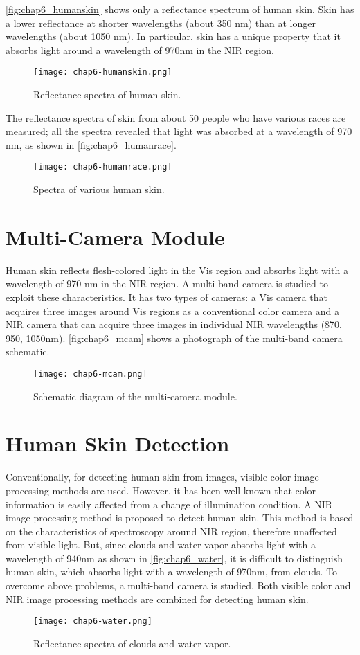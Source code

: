 \autoref{fig:chap6_humanskin} shows only a reflectance spectrum of human
skin. Skin has a lower reflectance at shorter wavelengths (about 350 nm) than at
longer wavelengths (about 1050 nm). In particular, skin has a unique
property that it absorbs light around a wavelength of 970nm in the NIR region.
\begin{figure}[ht]
  \centering
    \texttt{[image: chap6-humanskin.png]}
  \caption{Reflectance spectra of human skin.}
  \label{fig:chap6_humanskin}
\end{figure}

The reflectance spectra of skin from about 50 people who have various
races are measured; all the spectra revealed that light was absorbed
at a wavelength of 970 nm, as shown in \autoref{fig:chap6_humanrace}.

\begin{figure}[ht]
  \centering
    \texttt{[image: chap6-humanrace.png]}
  \caption{Spectra of various human skin.}
  \label{fig:chap6_humanrace}
\end{figure}

\section{Multi-Camera Module}
Human skin reflects flesh-colored light in the Vis region and absorbs light
with a wavelength of 970 nm in the NIR region. A multi-band camera is studied to
exploit these characteristics. It has two types of cameras: a Vis camera that
acquires three images around Vis regions as a conventional color camera and
a NIR camera that can acquire three images in individual NIR wavelengths (870, 950,
1050nm). \autoref{fig:chap6_mcam} shows a photograph of the multi-band camera schematic.

\begin{figure}[hb]
  \centering
    \texttt{[image: chap6-mcam.png]}
  \caption{Schematic diagram of the multi-camera module.}
  \label{fig:chap6_mcam}
\end{figure}
\section {Human Skin Detection}
Conventionally, for detecting human skin from images,
visible color image processing methods are used.
However, it has been well known that color information is easily affected
from a change of illumination condition. A NIR image processing method is proposed
to detect human skin. This method is based on the characteristics of spectroscopy
around NIR region, therefore unaffected from visible
light. But, since clouds and water vapor absorbs light
with a wavelength of 940nm as shown in \autoref{fig:chap6_water},
it is difficult to distinguish human skin, which absorbs light with a wavelength
of 970nm, from clouds. To overcome above problems, a multi-band camera is studied.
Both visible color and NIR image processing methods are combined for detecting
human skin.

\begin{figure}[hb]
  \centering
	\texttt{[image: chap6-water.png]}
  \caption{Reflectance spectra of clouds and water vapor.}
  \label{fig:chap6_water}
\end{figure}
